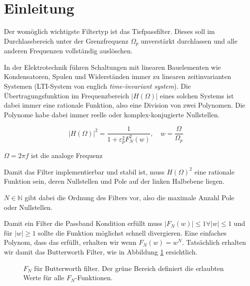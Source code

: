 \section{Einleitung}




Der womöglich wichtigste Filtertyp ist das Tiefpassfilter.
Dieses soll im Durchlassbereich unter der Grenzfrequenz $\Omega_p$ unverstärkt durchlassen und alle anderen Frequenzen vollständig auslöschen.


In der Elektrotechnik führen Schaltungen mit linearen Bauelementen wie Kondensatoren, Spulen und Widerständen immer zu linearen zeitinvarianten Systemen (LTI-System von englich \textit{time-invariant system}).
Die Übertragungsfunktion im Frequenzbereich $|H(\Omega)|$ eines solchen Systems ist dabei immer eine rationale Funktion, also eine Division von zwei Polynomen.
Die Polynome habe dabei immer reelle oder komplex-konjugierte Nullstellen.


\begin{equation} \label{ellfilter:eq:h_omega}
    | H(\Omega)|^2 = \frac{1}{1 + \varepsilon_p^2 F_N^2(w)}, \quad w=\frac{\Omega}{\Omega_p}
\end{equation}

$\Omega = 2 \pi f$ ist die analoge Frequenz


Damit das Filter implementierbar und stabil ist, muss $H(\Omega)^2$ eine rationale Funktion sein, deren Nullstellen und Pole auf der linken Halbebene liegen.

$N \in \mathbb{N} $ gibt dabei die Ordnung des Filters vor, also die maximale Anzahl Pole oder Nullstellen.

Damit ein Filter die Passband Kondition erfüllt muss $|F_N(w)| \leq 1 \forall |w| \leq 1$ und für $|w| \geq 1$ sollte die Funktion möglichst schnell divergieren.
Eine einfaches Polynom, dass das erfüllt, erhalten wir wenn $F_N(w) = w^N$.
Tatsächlich erhalten wir damit das Butterworth Filter, wie in Abbildung \ref{ellfilter:fig:butterworth} ersichtlich.
\begin{figure}
    \centering
    
    \caption{$F_N$ für Butterworth filter. Der grüne Bereich definiert die erlaubten Werte für alle $F_N$-Funktionen.}
    \label{ellfilter:fig:butterworth}
\end{figure}

